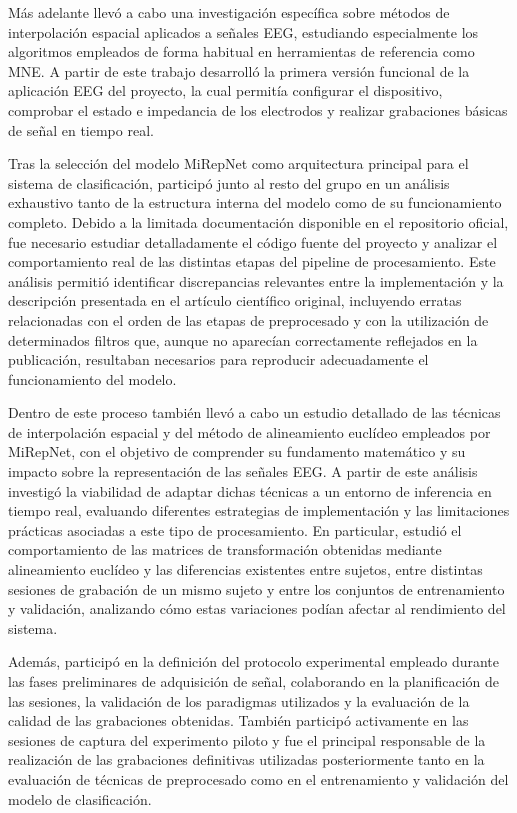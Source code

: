 Más adelante llevó a cabo una investigación específica sobre métodos de interpolación espacial aplicados a señales EEG, estudiando especialmente los algoritmos empleados de forma habitual en herramientas de referencia como MNE. A partir de este trabajo desarrolló la primera versión funcional de la aplicación EEG del proyecto, la cual permitía configurar el dispositivo, comprobar el estado e impedancia de los electrodos y realizar grabaciones básicas de señal en tiempo real.

Tras la selección del modelo MiRepNet como arquitectura principal para el sistema de clasificación, participó junto al resto del grupo en un análisis exhaustivo tanto de la estructura interna del modelo como de su funcionamiento completo. Debido a la limitada documentación disponible en el repositorio oficial, fue necesario estudiar detalladamente el código fuente del proyecto y analizar el comportamiento real de las distintas etapas del pipeline de procesamiento. Este análisis permitió identificar discrepancias relevantes entre la implementación y la descripción presentada en el artículo científico original, incluyendo erratas relacionadas con el orden de las etapas de preprocesado y con la utilización de determinados filtros que, aunque no aparecían correctamente reflejados en la publicación, resultaban necesarios para reproducir adecuadamente el funcionamiento del modelo.

Dentro de este proceso también llevó a cabo un estudio detallado de las técnicas de interpolación espacial y del método de alineamiento euclídeo empleados por MiRepNet, con el objetivo de comprender su fundamento matemático y su impacto sobre la representación de las señales EEG. A partir de este análisis investigó la viabilidad de adaptar dichas técnicas a un entorno de inferencia en tiempo real, evaluando diferentes estrategias de implementación y las limitaciones prácticas asociadas a este tipo de procesamiento. En particular, estudió el comportamiento de las matrices de transformación obtenidas mediante alineamiento euclídeo y las diferencias existentes entre sujetos, entre distintas sesiones de grabación de un mismo sujeto y entre los conjuntos de entrenamiento y validación, analizando cómo estas variaciones podían afectar al rendimiento del sistema.

Además, participó en la definición del protocolo experimental empleado durante las fases preliminares de adquisición de señal, colaborando en la planificación de las sesiones, la validación de los paradigmas utilizados y la evaluación de la calidad de las grabaciones obtenidas. También participó activamente en las sesiones de captura del experimento piloto y fue el principal responsable de la realización de las grabaciones definitivas utilizadas posteriormente tanto en la evaluación de técnicas de preprocesado como en el entrenamiento y validación del modelo de clasificación.

